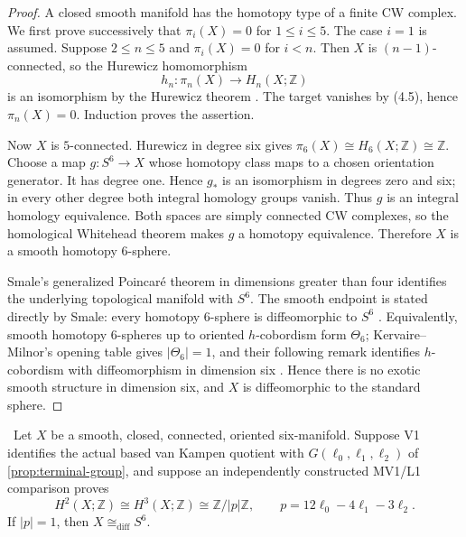 \begin{proof}
A closed smooth manifold has the homotopy type of a finite CW complex.
We first prove successively that $\pi_i(X)=0$ for $1\le i\le5$.
The case $i=1$ is assumed.  Suppose $2\le n\le5$ and
$\pi_i(X)=0$ for $i<n$.  Then $X$ is $(n-1)$-connected, so the Hurewicz
homomorphism
\[
h_n:\pi_n(X)\longrightarrow H_n(X;\mathbb Z)
\]
is an isomorphism by the Hurewicz theorem
\cite[Theorem~4.32]{Hatcher2002}.  The target vanishes by (4.5), hence
$\pi_n(X)=0$.  Induction proves the assertion.

Now $X$ is $5$-connected.  Hurewicz in degree six gives
$\pi_6(X)\cong H_6(X;\mathbb Z)\cong\mathbb Z$.  Choose a map
$g:S^6\to X$ whose homotopy class maps to a chosen orientation generator.
It has degree one.  Hence $g_*$ is an isomorphism in degrees zero and six;
in every other degree both integral homology groups vanish.  Thus $g$ is an
integral homology equivalence.  Both spaces are simply connected CW
complexes, so the homological Whitehead theorem
\cite[Corollary~4.33]{Hatcher2002} makes $g$ a homotopy equivalence.
Therefore $X$ is a smooth homotopy $6$-sphere.

Smale's generalized Poincar\'e theorem in dimensions greater than four
\cite[Theorem~A]{Smale1961} identifies the underlying topological manifold
with $S^6$.  The smooth endpoint is stated directly by Smale:
every homotopy $6$-sphere is diffeomorphic to $S^6$
\cite[Corollary~1.2]{Smale1962}.  Equivalently, smooth homotopy
$6$-spheres up to oriented $h$-cobordism form $\Theta_6$;
Kervaire--Milnor's opening table gives $|\Theta_6|=1$, and their following
remark identifies $h$-cobordism with diffeomorphism in dimension six
\cite[opening table and following Remark, pp.~504--505]{KervaireMilnor1963}.
Hence there is no exotic smooth structure in dimension six, and $X$ is
diffeomorphic to the standard sphere.
\end{proof}

\begin{corollary}\label{cor:abstract-s6}
\Verified\ Let $X$ be a smooth, closed, connected, oriented six-manifold.
Suppose V1 identifies the actual based van Kampen quotient
with $G(\ell_0,\ell_1,\ell_2)$ of
\cref{prop:terminal-group}, and suppose an independently constructed
MV1/L1 comparison proves
\[
H^2(X;\mathbb Z)\cong H^3(X;\mathbb Z)
\cong\mathbb Z/|p|\mathbb Z,
\qquad p=12\ell_0-4\ell_1-3\ell_2.
\tag{4.6}
\]
If $|p|=1$, then $X\cong_{\mathrm{diff}}S^6$.
\end{corollary}

